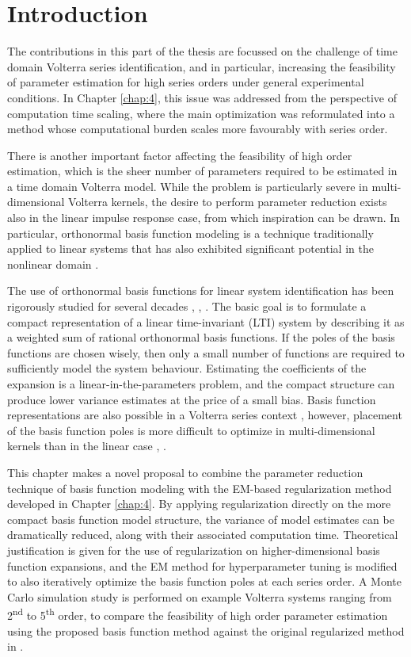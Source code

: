 \section{Introduction}

The contributions in this part of the thesis are focussed on the challenge of time domain Volterra series identification, and in particular, increasing the feasibility of parameter estimation for high series orders under general experimental conditions. In Chapter \ref{chap:4}, this issue was addressed from the perspective of computation time scaling, where the main optimization was reformulated into a method whose computational burden scales more favourably with series order.

There is another important factor affecting the feasibility of high order estimation, which is the sheer number of parameters required to be estimated in a time domain Volterra model. While the problem is particularly severe in multi-dimensional Volterra kernels, the desire to perform parameter reduction exists also in the linear impulse response case, from which inspiration can be drawn. In particular, orthonormal basis function modeling is a technique traditionally applied to linear systems \cite{Heuberger2005} that has also exhibited significant potential in the nonlinear domain \cite{Cheng2017}.

The use of orthonormal basis functions for linear system identification has been rigorously studied for several decades \cite{Heuberger2005}, \cite{Wahlberg1991}, \cite{Wahlberg1994}. The basic goal is to formulate a compact representation of a linear time-invariant (LTI) system by describing it as a weighted sum of rational orthonormal basis functions.  If the poles of the basis functions are chosen wisely, then only a small number of functions are required to sufficiently model the system behaviour.  Estimating the coefficients of the expansion is a linear-in-the-parameters problem, and the compact structure can produce lower variance estimates at the price of a small bias. Basis function representations are also possible in a Volterra series context \cite{Rugh1980}, however, placement of the basis function poles is more difficult to optimize in multi-dimensional kernels than in the linear case \cite{Campello2004}, \cite{Rosa2007}. 

This chapter makes a novel proposal to combine the parameter reduction technique of basis function modeling with the EM-based regularization method developed in Chapter \ref{chap:4}. By applying regularization directly on the more compact basis function model structure, the variance of model estimates can be dramatically reduced, along with their associated computation time. Theoretical justification is given for the use of regularization on higher-dimensional basis function expansions, and the EM method for hyperparameter tuning is modified to also iteratively optimize the basis function poles at each series order. A Monte Carlo simulation study is performed on example Volterra systems ranging from 2\textsuperscript{nd} to 5\textsuperscript{th} order, to compare the feasibility of high order parameter estimation using the proposed basis function method against the original regularized method in \cite{Birpoutsoukis2017}. 

